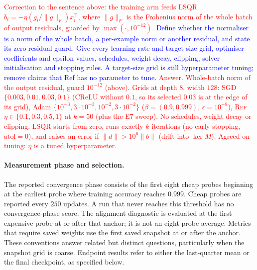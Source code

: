 \documentclass{article}
\newcommand{\zied}[1]{\textcolor{blue}{#1}}
\newcommand{\nat}[1]{\textcolor{red}{#1}}
\newcommand{\TOU}{\textsc{Ref}}
\theoremstyle{definition}
\theoremstyle{remark}
\begin{document}
\nat{Correction to the sentence above: the training arm feeds LSQR $b_i=-\eta(g_i/\|g\|_F)x_i^\top$, where $\|g\|_F$ is the Frobenius norm of the whole batch of output residuals, guarded by $\max(\cdot,10^{-12})$.}
\zied{Define whether the normaliser is a norm of the whole batch, a per-example norm or another residual, and state its zero-residual guard. Give every learning-rate and target-size grid, optimiser coefficients and epsilon values, schedules, weight decay, clipping, solver initialisation and stopping rules. A target-size grid is still hyperparameter tuning; remove claims that Ref has no parameter to tune.}
\nat{Answer. Whole-batch norm of the output residual, guard $10^{-12}$ (above). Grids at depth $8$, width $128$: SGD $\{0.003,0.01,0.03,0.1\}$ (CReLU without $0.1$, so its selected $0.03$ is at the edge of its grid), Adam $\{10^{-3},3\cdot10^{-3},10^{-2},3\cdot10^{-2}\}$ ($\beta=(0.9,0.999)$, $\epsilon=10^{-8}$), \TOU\ $\eta\in\{0.1,0.3,0.5,1\}$ at $k=50$ (plus the E7 sweep). No schedules, weight decay or clipping. LSQR starts from zero, runs exactly $k$ iterations (no early stopping, $\mathrm{atol}=0$), and raises an error if $\|d\|>10^6\|b\|$ (drift into $\ker M$). Agreed on tuning: $\eta$ is a tuned hyperparameter.}

\paragraph{Measurement phase and selection.}
The reported convergence phase consists of the first eight cheap probes beginning at the earliest probe where training accuracy reaches $0.999$. Cheap probes are reported every $250$ updates. A run that never reaches this threshold has no convergence-phase score. The alignment diagnostic is evaluated at the first expensive probe at or after that anchor; it is not an eight-probe average. Metrics that require saved weights use the first saved snapshot at or after the anchor. These conventions answer related but distinct questions, particularly when the snapshot grid is coarse. Endpoint results refer to either the last-quarter mean or the final checkpoint, as specified below.
\end{document}
